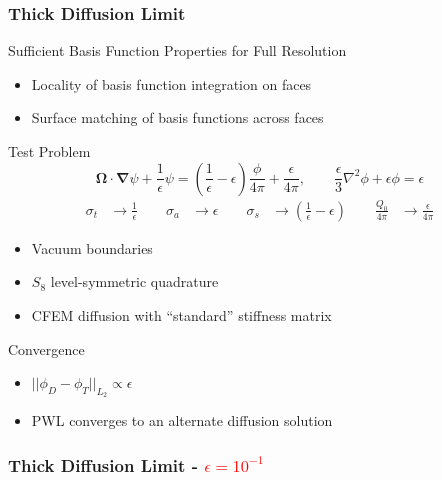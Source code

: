 \documentclass[compress,10pt]{beamer}
\renewcommand{\vec}[1]{\mathbf{#1}}
\newcommand{\tcr}[1]{\textcolor{red}{#1}}
\begin{document}
\begin{frame}[t]
{
\frametitle{\small Thick Diffusion Limit}{\small
\vspace{-3mm}
\begin{block}{Sufficient Basis Function Properties for Full Resolution}
\begin{itemize}
\item Locality of basis function integration on faces
\item Surface matching of basis functions across faces
\end{itemize}
\end{block}
\vspace{-3mm}
\begin{block}{Test Problem}
\begin{equation*}
\vec{\Omega} \cdot \vec{\nabla} \psi + \frac{1}{\epsilon} \psi =  \left( \frac{1}{\epsilon} - \epsilon   \right)  \frac{\phi}{4 \pi} +  \frac{\epsilon}{4 \pi},  \qquad \frac{\epsilon}{3} {\nabla}^2 \phi + \epsilon  \phi =  \epsilon
\end{equation*}
\vspace{1mm}
\begin{equation*}
\begin{aligned}
	\sigma_t &\rightarrow \frac{1}{\epsilon}  \qquad
	\sigma_a &\rightarrow \epsilon  \qquad
	\sigma_s &\rightarrow \left( \frac{1}{\epsilon} - \epsilon   \right)  \qquad
	\frac{Q_0}{4 \pi} &\rightarrow  \frac{\epsilon}{4 \pi}
\end{aligned}
\end{equation*}
\vspace{-1mm}
\begin{itemize}
\item Vacuum boundaries
\item $S_8$ level-symmetric quadrature
\item CFEM diffusion with ``standard'' stiffness matrix
\end{itemize}
\end{block}
\vspace{-3mm}
\begin{block}{Convergence}
\begin{itemize}
\item $|| \phi_D - \phi_T||_{L_2} \propto \epsilon$
\item PWL converges to an alternate diffusion solution
\end{itemize}
\end{block}
}
}
{
\frametitle{Thick Diffusion Limit - \tcr{$\epsilon = 10^{-1}$}}
}
\end{frame}
\end{document}
